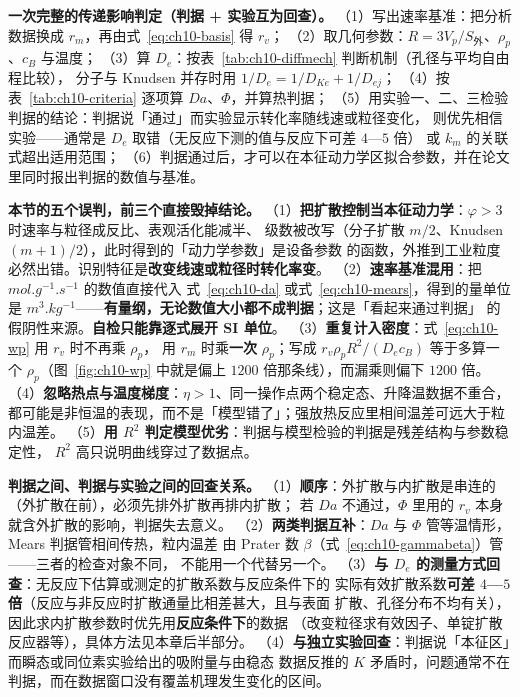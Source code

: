\begin{dataflow}
\textbf{一次完整的传递影响判定（判据 + 实验互为回查）。}
（1）写出速率基准：把分析数据换成 $r_m$，再由式~\eqref{eq:ch10-basis} 得 $r_v$；
（2）取几何参数：$R=3V_p/S_{\text{外}}$、$\rho_p$、$c_B$ 与温度；
（3）算 $D_e$：按表~\ref{tab:ch10-diffmech} 判断机制（孔径与平均自由程比较），
分子与 Knudsen 并存时用 $1/D_e=1/D_{Ke}+1/D_{ej}$；
（4）按表~\ref{tab:ch10-criteria} 逐项算 $Da$、$\Phi$，并算热判据；
（5）用实验一、二、三检验判据的结论：判据说「通过」而实验显示转化率随线速或粒径变化，
则优先相信实验——通常是 $D_e$ 取错（无反应下测的值与反应下可差 $4$—$5$ 倍）
或 $k_m$ 的关联式超出适用范围；
（6）判据通过后，才可以在本征动力学区拟合参数，并在论文里同时报出判据的数值与基准。
\end{dataflow}

\begin{pitfall}
\textbf{本节的五个误判，前三个直接毁掉结论。}
（1）\textbf{把扩散控制当本征动力学}：$\varphi>3$ 时速率与粒径成反比、表观活化能减半、
级数被改写（分子扩散 $m/2$、Knudsen $(m+1)/2$），此时得到的「动力学参数」是设备参数
的函数，外推到工业粒度必然出错。识别特征是\textbf{改变线速或粒径时转化率变}。
（2）\textbf{速率基准混用}：把 $\unit{mol.g^{-1}.s^{-1}}$ 的数值直接代入
式~\eqref{eq:ch10-da} 或式~\eqref{eq:ch10-mears}，得到的量单位是
$\unit{m^3.kg^{-1}}$——\textbf{有量纲，无论数值大小都不成判据}；这是「看起来通过判据」
的假阴性来源。\textbf{自检只能靠逐式展开 SI 单位}。
（3）\textbf{重复计入密度}：式~\eqref{eq:ch10-wp} 用 $r_v$ 时不再乘 $\rho_p$，
用 $r_m$ 时乘\textbf{一次} $\rho_p$；写成 $r_v\rho_pR^2/(D_ec_B)$ 等于多算一个
$\rho_p$（图~\ref{fig:ch10-wp} 中就是偏上 $1200$ 倍那条线），而漏乘则偏下 $1200$ 倍。
（4）\textbf{忽略热点与温度梯度}：$\eta>1$、同一操作点两个稳定态、升降温数据不重合，
都可能是非恒温的表现，而不是「模型错了」；强放热反应里相间温差可远大于粒内温差。
（5）\textbf{用 $R^2$ 判定模型优劣}：判据与模型检验的判据是残差结构与参数稳定性，
$R^2$ 高只说明曲线穿过了数据点。
\end{pitfall}

\begin{crosscheck}
\textbf{判据之间、判据与实验之间的回查关系。}
（1）\textbf{顺序}：外扩散与内扩散是串连的（外扩散在前），必须先排外扩散再排内扩散；
若 $Da$ 不通过，$\Phi$ 里用的 $r_v$ 本身就含外扩散的影响，判据失去意义。
（2）\textbf{两类判据互补}：$Da$ 与 $\Phi$ 管等温情形，Mears 判据管相间传热，粒内温差
由 Prater 数 $\beta$（式~\eqref{eq:ch10-gammabeta}）管——三者的检查对象不同，
不能用一个代替另一个。
（3）\textbf{与 $D_e$ 的测量方式回查}：无反应下估算或测定的扩散系数与反应条件下的
实际有效扩散系数\textbf{可差 $4$—$5$ 倍}（反应与非反应时扩散通量比相差甚大，且与表面
扩散、孔径分布不均有关），因此求内扩散参数时优先用\textbf{反应条件下}的数据
（改变粒径求有效因子、单锭扩散反应器等），具体方法见本章后半部分。
（4）\textbf{与独立实验回查}：判据说「本征区」而瞬态或同位素实验给出的吸附量与由稳态
数据反推的 $K$ 矛盾时，问题通常不在判据，而在数据窗口没有覆盖机理发生变化的区间。
\end{crosscheck}
